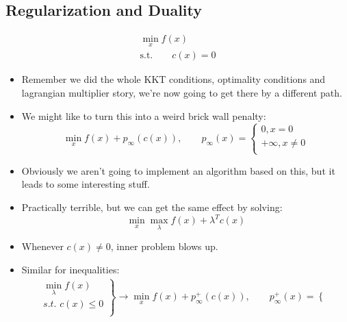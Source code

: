 \subsection{Regularization and Duality}
\begin{equation}
    \begin{aligned}
        \min_x f(x) \\
        \text{s.t.} \qquad c(x) = 0
    \end{aligned}
\end{equation}

\begin{itemize}
    \item Remember we did the whole KKT conditions, optimality conditions and lagrangian multiplier story, we're now going to get there by a different path.
    \item We might like to turn this into a weird brick wall penalty:
    \begin{equation}
        \min_xf\left( x \right) +p_{\infty}\left( c\left( x \right) \right) ,\qquad p_{\infty}\left( x \right) =\left\{ \begin{array}{l}
            0,x=0\\
            +\infty ,x\ne 0\\
        \end{array} \right. 
    \end{equation}
    \item Obviously we aren't going to implement an algorithm based on this, but it leads to some interesting stuff.
    \item Practically terrible, but we can get the same effect by solving:
    \begin{equation}
        \min_x\max_{\lambda}f\left( x \right) +\lambda ^Tc\left( x \right) 
    \end{equation}
    \item Whenever $c(x)\ne0$, inner problem blows up.
    \item Similar for inequalities:
    \begin{equation}
        \begin{array}{c}
            \left. \begin{array}{r}
            \min_{\lambda}f\left( x \right)\\
            s.t.\,\,c\left( x \right) \le 0\\
        \end{array} \right\} \rightarrow \min_xf\left( x \right) +p_{\infty}^{+}\left( c\left( x \right) \right) ,\qquad p_{\infty}^{+}\left( x \right) =\left\{ \begin{array}{l}

\end{array}
\end{array}
\end{equation}
\end{itemize}

